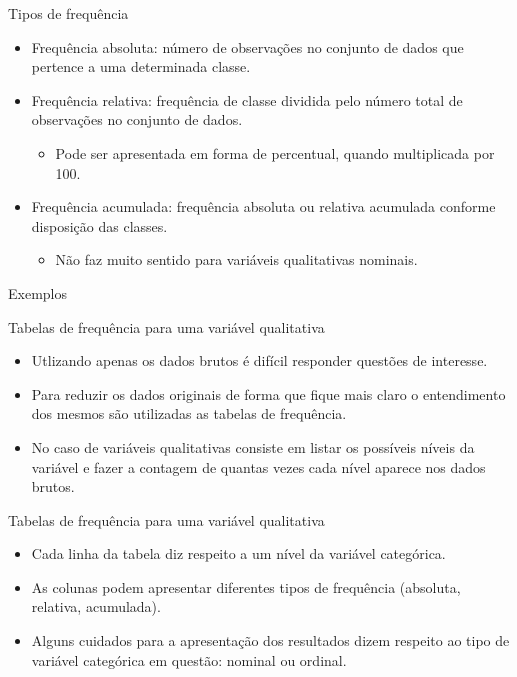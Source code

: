 \documentclass[
  ignorenonframetext,
  serif,
  professionalfont,
  usenames,
  dvipsnames,
  aspectratio = 169]{beamer}
\providecommand{\tightlist}{%
  \setlength{\itemsep}{0pt}\setlength{\parskip}{0pt}}
\renewcommand{\tightlist}{%
  \setlength{\itemsep}{0\baselineskip}
  \setlength{\parskip}{0.25\baselineskip}
}
\begin{document}
\begin{frame}{Tipos de frequência}
\protect\hypertarget{tipos-de-frequuxeancia}{}
\begin{itemize}
\item
  Frequência absoluta: número de observações no conjunto de dados que
  pertence a uma determinada classe.
\item
  Frequência relativa: frequência de classe dividida pelo número total
  de observações no conjunto de dados.

  \begin{itemize}
  \tightlist
  \item
    Pode ser apresentada em forma de percentual, quando multiplicada por
    100.
  \end{itemize}
\item
  Frequência acumulada: frequência absoluta ou relativa acumulada
  conforme disposição das classes.

  \begin{itemize}
  \tightlist
  \item
    Não faz muito sentido para variáveis qualitativas nominais.
  \end{itemize}
\end{itemize}
\end{frame}

\begin{frame}{Exemplos}
\protect\hypertarget{exemplos}{}
\end{frame}

\begin{frame}{Tabelas de frequência para uma variável qualitativa}
\protect\hypertarget{tabelas-de-frequuxeancia-para-uma-variuxe1vel-qualitativa}{}
\begin{itemize}
\item
  Utlizando apenas os dados brutos é difícil responder questões de
  interesse.
\item
  Para reduzir os dados originais de forma que fique mais claro o
  entendimento dos mesmos são utilizadas as tabelas de frequência.
\item
  No caso de variáveis qualitativas consiste em listar os possíveis
  níveis da variável e fazer a contagem de quantas vezes cada nível
  aparece nos dados brutos.
\end{itemize}
\end{frame}

\begin{frame}{Tabelas de frequência para uma variável qualitativa}
\protect\hypertarget{tabelas-de-frequuxeancia-para-uma-variuxe1vel-qualitativa-1}{}
\begin{itemize}
\item
  Cada linha da tabela diz respeito a um nível da variável categórica.
\item
  As colunas podem apresentar diferentes tipos de frequência (absoluta,
  relativa, acumulada).
\item
  Alguns cuidados para a apresentação dos resultados dizem respeito ao
  tipo de variável categórica em questão: nominal ou ordinal.
\end{itemize}
\end{frame}
\end{document}
